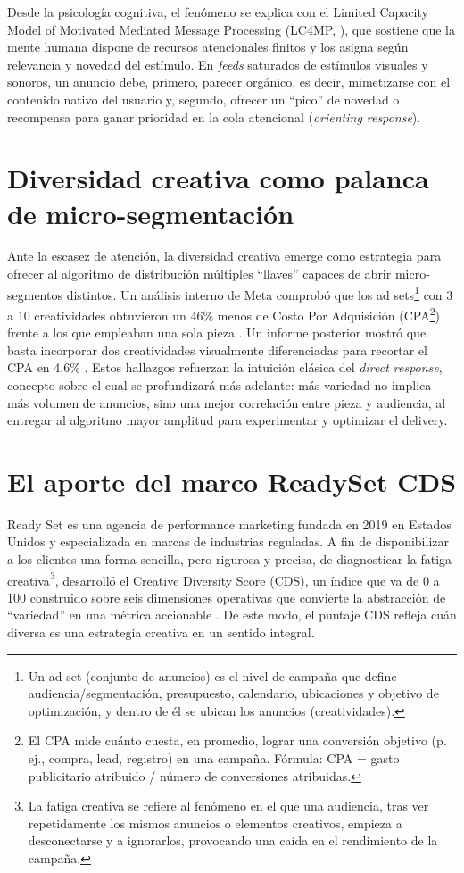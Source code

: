 \documentclass[12pt, a4paper]{report}
\begin{document}
Desde la psicología cognitiva, el fenómeno se explica con el Limited Capacity Model of
Motivated Mediated Message Processing (LC4MP, \citealt{lang2000}), que sostiene que la
mente humana dispone de recursos atencionales finitos y los asigna según relevancia
y novedad del estímulo. En \textit{feeds} saturados de estímulos visuales y
sonoros, un anuncio debe, primero, parecer orgánico, es decir, mimetizarse con el
contenido nativo del usuario y, segundo, ofrecer un ``pico'' de novedad o recompensa
para ganar prioridad en la cola atencional (\textit{orienting response}).

\section{Diversidad creativa como palanca de micro-segmentación}

Ante la escasez de atención, la diversidad creativa emerge como estrategia para
ofrecer al algoritmo de distribución múltiples ``llaves'' capaces de abrir
micro-segmentos distintos. Un análisis interno de Meta comprobó que los ad
sets\footnote{Un ad set (conjunto de anuncios) es el nivel de campaña que define audiencia/segmentación,
presupuesto, calendario, ubicaciones y objetivo de optimización, y dentro de él se ubican los anuncios
(creatividades).}
con 3 a 10 creatividades obtuvieron un 46\% menos de Costo Por Adquisición
(CPA\footnote{El CPA mide cuánto cuesta, en promedio, lograr una conversión objetivo (p. ej., compra, lead,
registro) en una campaña. Fórmula: CPA = gasto publicitario atribuido / número de conversiones atribuidas.})
frente a los que empleaban una sola pieza \citep{meta2024a}. Un informe posterior
mostró que basta incorporar dos creatividades visualmente diferenciadas para
recortar el CPA en 4,6\% \citep{meta2024b}. Estos hallazgos refuerzan la intuición
clásica del \textit{direct response}, concepto sobre el cual se profundizará más adelante:
más variedad no implica más volumen de anuncios, sino una mejor correlación entre
pieza y audiencia, al entregar al algoritmo mayor amplitud para experimentar y
optimizar el delivery.

\section{El aporte del marco ReadySet CDS}

Ready Set es una agencia de performance marketing fundada en 2019 en Estados
Unidos y especializada en marcas de industrias reguladas. A fin de disponibilizar a
los clientes una forma sencilla, pero rigurosa y precisa, de diagnosticar la fatiga
creativa\footnote{La fatiga creativa se refiere al fenómeno en el que una audiencia, tras ver repetidamente los
mismos anuncios o elementos creativos, empieza a desconectarse y a ignorarlos, provocando una
caída en el rendimiento de la campaña.}, desarrolló el Creative Diversity Score (CDS), un índice que va de 0 a 100
construido sobre seis dimensiones operativas que convierte la abstracción de
``variedad'' en una métrica accionable \citep{readyset2025}. De este modo, el puntaje
CDS refleja cuán diversa es una estrategia creativa en un sentido integral.
\end{document}
